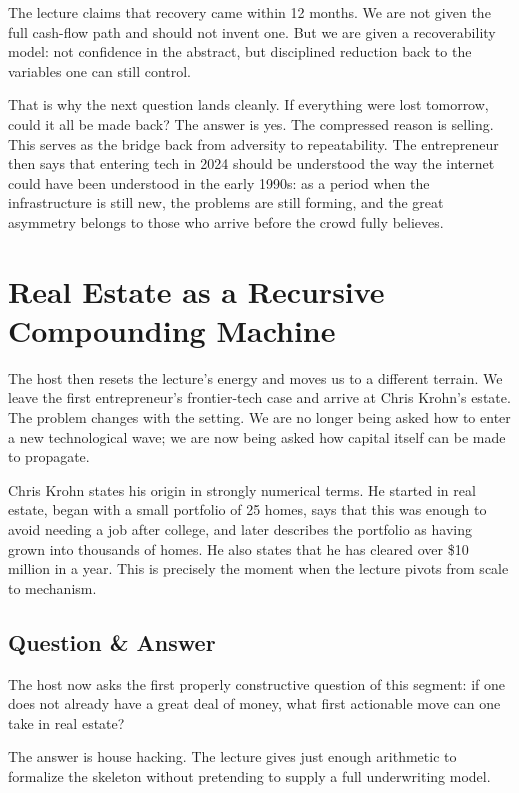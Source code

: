 The lecture claims that recovery came within 12 months. We are not given the full cash-flow path and should not invent one. But we are given a recoverability model: not confidence in the abstract, but disciplined reduction back to the variables one can still control.

That is why the next question lands cleanly. If everything were lost tomorrow, could it all be made back? The answer is yes. The compressed reason is selling. This serves as the bridge back from adversity to repeatability. The entrepreneur then says that entering tech in 2024 should be understood the way the internet could have been understood in the early 1990s: as a period when the infrastructure is still new, the problems are still forming, and the great asymmetry belongs to those who arrive before the crowd fully believes.

\section{Real Estate as a Recursive Compounding Machine}

The host then resets the lecture's energy and moves us to a different terrain. We leave the first entrepreneur's frontier-tech case and arrive at Chris Krohn's estate. The problem changes with the setting. We are no longer being asked how to enter a new technological wave; we are now being asked how capital itself can be made to propagate.

Chris Krohn states his origin in strongly numerical terms. He started in real estate, began with a small portfolio of 25 homes, says that this was enough to avoid needing a job after college, and later describes the portfolio as having grown into thousands of homes. He also states that he has cleared over \$10 million in a year. This is precisely the moment when the lecture pivots from scale to mechanism.

\subsection{Question \& Answer}

The host now asks the first properly constructive question of this segment: if one does not already have a great deal of money, what first actionable move can one take in real estate?

The answer is house hacking. The lecture gives just enough arithmetic to formalize the skeleton without pretending to supply a full underwriting model.

